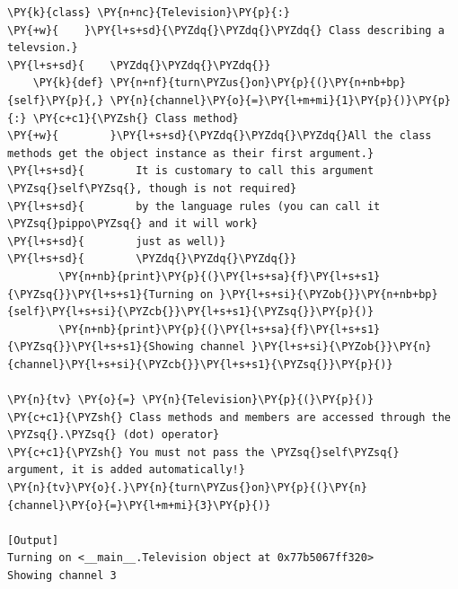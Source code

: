 \begin{Verbatim}[label=\makebox{\url{https://github.com/lucabaldini/cmepda/tree/master/slides/latex/snippets/class\_methods.py}},commandchars=\\\{\}]
\PY{k}{class} \PY{n+nc}{Television}\PY{p}{:}
\PY{+w}{    }\PY{l+s+sd}{\PYZdq{}\PYZdq{}\PYZdq{} Class describing a televsion.}
\PY{l+s+sd}{    \PYZdq{}\PYZdq{}\PYZdq{}}
    \PY{k}{def} \PY{n+nf}{turn\PYZus{}on}\PY{p}{(}\PY{n+nb+bp}{self}\PY{p}{,} \PY{n}{channel}\PY{o}{=}\PY{l+m+mi}{1}\PY{p}{)}\PY{p}{:} \PY{c+c1}{\PYZsh{} Class method}
\PY{+w}{        }\PY{l+s+sd}{\PYZdq{}\PYZdq{}\PYZdq{}All the class methods get the object instance as their first argument.}
\PY{l+s+sd}{        It is customary to call this argument \PYZsq{}self\PYZsq{}, though is not required}
\PY{l+s+sd}{        by the language rules (you can call it \PYZsq{}pippo\PYZsq{} and it will work}
\PY{l+s+sd}{        just as well)}
\PY{l+s+sd}{        \PYZdq{}\PYZdq{}\PYZdq{}}
        \PY{n+nb}{print}\PY{p}{(}\PY{l+s+sa}{f}\PY{l+s+s1}{\PYZsq{}}\PY{l+s+s1}{Turning on }\PY{l+s+si}{\PYZob{}}\PY{n+nb+bp}{self}\PY{l+s+si}{\PYZcb{}}\PY{l+s+s1}{\PYZsq{}}\PY{p}{)}
        \PY{n+nb}{print}\PY{p}{(}\PY{l+s+sa}{f}\PY{l+s+s1}{\PYZsq{}}\PY{l+s+s1}{Showing channel }\PY{l+s+si}{\PYZob{}}\PY{n}{channel}\PY{l+s+si}{\PYZcb{}}\PY{l+s+s1}{\PYZsq{}}\PY{p}{)}

\PY{n}{tv} \PY{o}{=} \PY{n}{Television}\PY{p}{(}\PY{p}{)}
\PY{c+c1}{\PYZsh{} Class methods and members are accessed through the \PYZsq{}.\PYZsq{} (dot) operator}
\PY{c+c1}{\PYZsh{} You must not pass the \PYZsq{}self\PYZsq{} argument, it is added automatically!}
\PY{n}{tv}\PY{o}{.}\PY{n}{turn\PYZus{}on}\PY{p}{(}\PY{n}{channel}\PY{o}{=}\PY{l+m+mi}{3}\PY{p}{)}

[Output]
Turning on <__main__.Television object at 0x77b5067ff320>
Showing channel 3
\end{Verbatim}